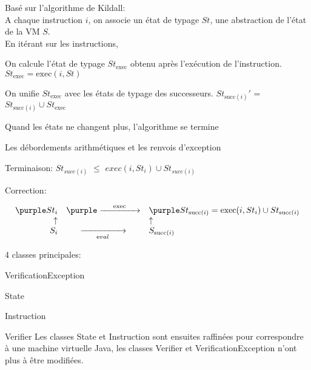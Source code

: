 
Bas\'e sur l'algorithme de {\purple Kildall}:\\ 
A chaque instruction $i$, on associe un \'etat de typage $St$, 
une abstraction de l'\'etat de la VM $S$.\\
En it\'erant sur les instructions,
\blist 
\item On calcule l'\'etat de typage $St_{\textrm{exec}}$
obtenu apr\`es l'ex\'ecution de l'instruction.  $St_{\textrm{exec}} = \textrm{exec}(i,St)$
\item On unifie  $St_{\textrm{exec}}$ avec les \'etats de typage des
 successeurs. $St_{\textrm{succ}(i)}'$ = $St_{\textrm{succ}(i)} \cup St_{\textrm{exec}}$
\item Quand les \'etats ne changent plus, l'algorithme se termine
\elist


\blist
\item  Les d\'ebordements arithm\'etiques et les renvois d'exception

\item Terminaison:
$St_{succ(i)}$ $\leq$ $exec(i, St_{i}) \cup St_{succ(i)}$
\item Correction:
\begin{center}\begin{minipage}{8cm} 
$$
\begin{array}{rcl}
{\purple St_{i}} &  
{\purple \xrightarrow[]{\textrm{\ \ \ \ \ exec\ \ \ \ \ }}} & 
{\purple St_{\textrm{succ}(i)} = \textrm{exec}(i, St_{i}) \cup St_{\textrm{succ}(i)}} \\ 
\uparrow &  & \uparrow \\
S_{i} & \xrightarrow[\ \ \ \ \ {\textrm eval}\ \ \ \ \ ]{} & S_{\textrm{succ}(i)}\\
\end{array}$$
\end{minipage}
\end{center}

\elist

4 classes principales:
\blist
\item VerificationException
\item State
\item Instruction
\item Verifier
\elist \small
Les classes State et Instruction sont ensuites raffin\'ees pour
 correspondre \`a une machine virtuelle Java, les 
classes Verifier et VerificationException n'ont plus \`a \^etre modifi\'ees.

